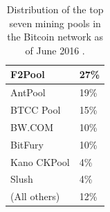 \documentclass[USenglish,oneside,twocolumn]{article}
\begin{document}


\begin{table}[h]
	\small
	\vspace{-8px}
	\centering
	\begin{tabularx}{0.6\linewidth}{ | C{1} || C{1} || }
		F2Pool & 27\% \\ \hline
		AntPool & 19\% \\ \hline
		BTCC Pool & 15\% \\ \hline
		BW.COM & 10\% \\ \hline
		BitFury & 10\% \\ \hline
		Kano CKPool & 4\% \\ \hline
		Slush & 4\% \\ \hline
		(All others) & 12\% \\ \hline
	\end{tabularx}
	\caption{Distribution of the top seven mining pools in the Bitcoin network as of June 2016 \cite{BitcoinHashrate}.}
	\label{fig:poolHashrates}
	\vspace{-27px}
\end{table}
\end{document}
